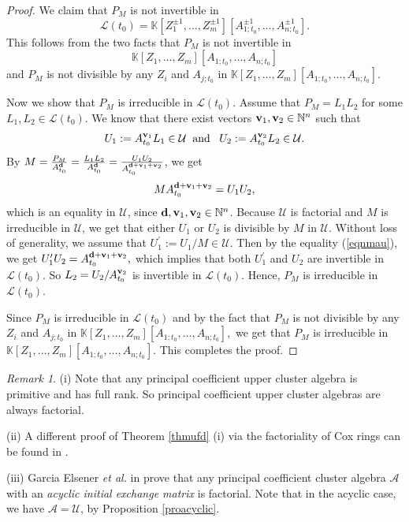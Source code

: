\documentclass{amsart}
\theoremstyle{definition}
\theoremstyle{remark}
\newtheorem{remark}[theorem]{Remark}
\numberwithin{equation}{section}
\begin{document}
\begin{proof}
We claim that  $P_M$ is not invertible in
$$\mathcal L(t_0)=\mathbb K[Z_1^{\pm1},\ldots,Z_m^{\pm1}][A_{1;t_0}^{\pm1},\ldots,A_{n;t_0}^{\pm1}].$$ This follows from the two facts that $P_M$ is not invertible in $$\mathbb K[Z_1,\ldots,Z_m][A_{1;t_0},\ldots,A_{n;t_0}]$$ and $P_M$ is not divisible by any $Z_i$ and $A_{j;t_0}$ in $\mathbb K[Z_1,\ldots,Z_m][A_{1;t_0},\ldots,A_{n;t_0}]$.




Now we show that $P_M$ is irreducible in $\mathcal L(t_0)$. Assume that $P_M=L_1L_2$ for some $L_1,L_2\in\mathcal L(t_0)$. We know that there exist vectors ${\bf v}_1,{\bf v}_2\in\mathbb N^n$ such that
$$U_1:=A_{t_0}^{{\bf v}_1}L_1\in\mathcal U\;\;\text{and}\;\;\; U_2:=A_{t_0}^{{\bf v}_2}L_2\in\mathcal U.$$ By $M=\frac{P_M}{A_{t_0}^{\bf d}}=\frac{L_1L_2}{A_{t_0}^{\bf d}}=\frac{U_1U_2}{A_{t_0}^{{\bf d}+{\bf v}_1+{\bf v}_2}}$, we get
\begin{eqnarray}\label{eqnmau}
MA_{t_0}^{{\bf d}+{\bf v}_1+{\bf v}_2}=U_1U_2,
\end{eqnarray}
which is an equality in $\mathcal U$, since ${\bf d},{\bf v}_1,{\bf v}_2\in\mathbb N^n$. Because $\mathcal U$ is factorial and $M$ is irreducible in $\mathcal U$, we get that either $U_1$ or $U_2$ is divisible by $M$ in $\mathcal U$. Without loss of generality, we assume that $U_1^\prime:=U_1/M\in\mathcal U$. Then by the equality (\ref{eqnmau}), we get $U_1^\prime U_2=A_{t_0}^{{\bf d}+{\bf v}_1+{\bf v}_2},$ which implies that both $U_1^\prime$ and $U_2$ are invertible in $\mathcal L(t_0)$. So $L_2=U_2/A_{t_0}^{{\bf v}_2}$ is invertible in $\mathcal L(t_0)$. Hence,  $P_M$ is irreducible in $\mathcal L(t_0)$.

Since $P_M$ is irreducible in $\mathcal L(t_0)$ and by
the fact that $P_M$ is not divisible by any $Z_i$ and $A_{j;t_0}$ in $\mathbb K[Z_1,\ldots,Z_m][A_{1;t_0},\ldots,A_{n;t_0}],$ we get that $P_M$ is irreducible in $\mathbb K[Z_1,\ldots,Z_m][A_{1;t_0},\ldots,A_{n;t_0}]$. This completes the proof.
\end{proof}




\begin{remark}(i) Note that any principal coefficient upper cluster algebra is primitive and has full rank. So principal coefficient upper cluster algebras are always factorial.


(ii) A different proof of Theorem \ref{thmufd} (i) via the factoriality of Cox rings can be found in \cite[Corollary 4.7]{GHK15}.


 (iii) Garcia Elsener {\em et al.} in \cite[Corollary 5.3]{GLS19} prove that any principal coefficient cluster algebra $\mathcal A$ with an {\em acyclic initial exchange matrix} is factorial.
 Note that in the acyclic case, we have $\mathcal A=\mathcal U$, by Proposition \ref{proacyclic}.
\end{remark}
\end{document}
